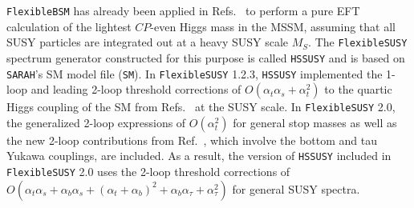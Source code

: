 \documentclass[final,3p,11pt,pdflatex]{elsarticle}
\makeatletter
\newcommand{\modelname}[1]{\texttt{#1}\@\xspace}
\newcommand{\sarah}{\texttt{SARAH}\@\xspace}
\newcommand{\fs}{\texttt{FlexibleSUSY}\@\xspace}
\newcommand{\HSSUSY}{\modelname{HSSUSY}}
\newcommand{\fstwo}{\fs 2.0\@\xspace}
\newcommand{\fbsm}{\texttt{FlexibleBSM}\@\xspace}
\newcommand{\MS}{\ensuremath{M_S}\xspace}
\newcommand{\CP}{\ensuremath{CP}\xspace}
\def\at{\alpha_t}
\def\ab{\alpha_b}
\def\as{\alpha_s}
\def\atau{\alpha_{\tau}}
\makeatother
\begin{document}
\fbsm has already been applied in
Refs.~\cite{Bagnaschi:2015pwa,Athron:2016fuq,Bagnaschi:2017xid} to perform a
pure EFT calculation of the lightest \CP-even Higgs mass in the MSSM,
assuming that all SUSY particles are integrated out at a heavy SUSY
scale $\MS$.  The \fs spectrum generator constructed for this purpose
is called \HSSUSY and is based on \sarah's SM model file
(\modelname{SM}).  In \fs 1.2.3, \HSSUSY implemented the 1-loop and leading
2-loop threshold corrections of $O(\at\as + \at^2)$ to the quartic Higgs
coupling of the SM from
Refs.~\cite{Bagnaschi:2014rsa,Vega:2015fna} at the SUSY scale.  In
\fstwo, the generalized 2-loop expressions of $O(\at^2)$ for general stop
masses as well as the new 2-loop contributions from Ref.~\cite{Bagnaschi:2017xid},
which involve the bottom and tau Yukawa couplings, are
included.  As a result, the version of \HSSUSY included in \fstwo uses
the 2-loop threshold corrections of
$O(\at\as + \ab\as + (\at+\ab)^2 + \ab\atau + \atau^2)$ for general
SUSY spectra.
\end{document}
